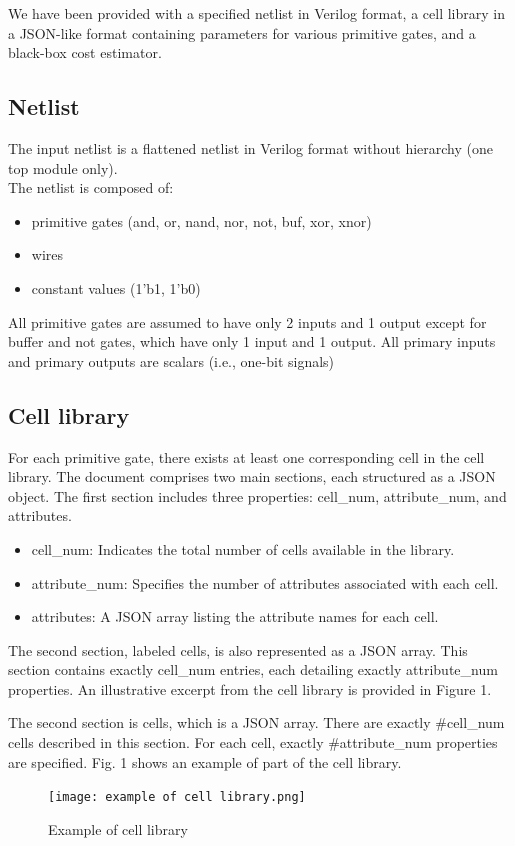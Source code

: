 \documentclass[conference]{IEEEtran}
\begin{document}
We have been provided with a specified netlist in Verilog format, a cell library in a JSON-like format containing parameters for various primitive gates, and a black-box cost estimator.

\subsection{Netlist}

The input netlist is a flattened netlist in Verilog format without hierarchy (one top module only).\\
The netlist is composed of:
\begin{itemize}
    \item primitive gates (and, or, nand, nor, not, buf, xor, xnor)
    \item wires
    \item constant values (1’b1, 1’b0)
\end{itemize}
All primitive gates are assumed to have only 2 inputs and 1 output
except for buffer and not gates, which have only 1 input and 1 output.
All primary inputs and primary outputs are scalars (i.e., one-bit signals)\\

\subsection{Cell library}

For each primitive gate, there exists at least one corresponding cell in the cell library. The document comprises two main sections, each structured as a JSON object. The first section includes three properties: cell\_num, attribute\_num, and attributes.
\begin{itemize}
\item cell\_num: Indicates the total number of cells available in the library.
\item attribute\_num: Specifies the number of attributes associated with each cell.
\item attributes: A JSON array listing the attribute names for each cell.
\end{itemize}
The second section, labeled cells, is also represented as a JSON array. This section contains exactly cell\_num entries, each detailing exactly attribute\_num properties. An illustrative excerpt from the cell library is provided in Figure 1.

The second section is cells, which is a JSON array. There are exactly \#cell\_num cells described in this section. For each cell, exactly \#attribute\_num properties are specified. Fig. 1 shows an example of part of the cell library.
\begin{figure}
    \centering
    \texttt{[image: example of cell library.png]}
    \caption{Example of cell library}
    \label{fig:enter-label}
\end{figure}
\end{document}

